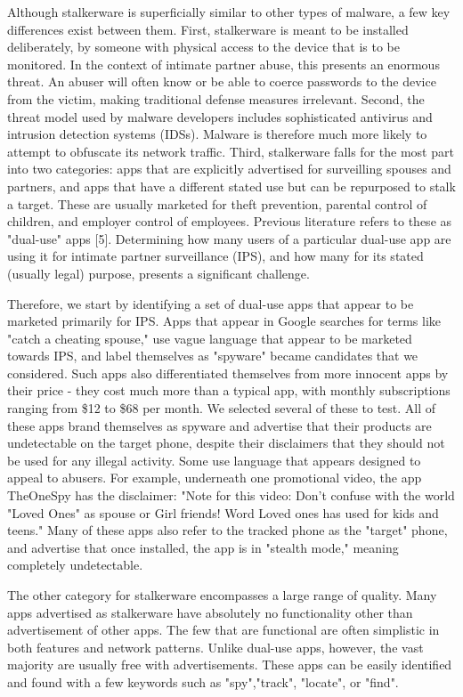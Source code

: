 \documentclass[acmtog]{acmart}
\begin{document}
Although stalkerware is superficially similar to other types of malware, a few 
key differences exist between them. First, stalkerware is meant to be installed 
deliberately, by someone with physical access to the device that is to be 
monitored. In the context of intimate partner abuse, this presents an enormous 
threat. An abuser will often know or be able to coerce passwords to the device 
from the victim, making traditional defense measures irrelevant. Second, the 
threat model used by malware developers includes sophisticated antivirus and 
intrusion detection systems (IDSs). Malware is therefore much more likely to 
attempt to obfuscate its network traffic. Third, stalkerware falls for the most 
part into two categories: apps that are explicitly advertised for surveilling 
spouses and partners, and apps that have a different stated use but can be 
repurposed to stalk a target. These are usually marketed for theft prevention, 
parental control of children, and employer control of employees. Previous 
literature refers to these as "dual-use" apps [5]. Determining how many users 
of a particular dual-use app are using it for intimate partner surveillance 
(IPS), and how many for its stated (usually legal) purpose, presents a 
significant challenge.

Therefore, we start by identifying a set of dual-use apps that appear to be 
marketed primarily for IPS. Apps that appear in Google searches for terms like 
"catch a cheating spouse," use vague language that appear to be marketed 
towards IPS, and label themselves as "spyware" became candidates that we 
considered. Such apps also differentiated themselves from more innocent apps by 
their price - they cost much more than a typical app, with monthly 
subscriptions ranging from \$12 to \$68 per month. We selected several of these 
to test. All of these apps brand themselves as spyware and advertise that their 
products are undetectable on the target phone, despite their disclaimers that 
they should not be used for any illegal activity. Some use language that 
appears designed to appeal to abusers. For example, underneath one promotional 
video, the app TheOneSpy has the disclaimer: "Note for this video: Don't 
confuse with the world "Loved Ones" as spouse or Girl friends! Word Loved ones 
has used for kids and teens." Many of these apps also refer to the tracked 
phone as the "target" phone, and advertise that once installed, the app is in 
"stealth mode," meaning completely undetectable. 

The other category for stalkerware encompasses a large range of quality. Many 
apps advertised as stalkerware have absolutely no functionality other than 
advertisement of other apps. The few that are functional are often simplistic 
in both features and network patterns. Unlike dual-use apps, however, the vast 
majority are usually free with advertisements. These apps can be easily 
identified and found with a few keywords such as "spy","track", "locate", or 
"find". 
\end{document}

